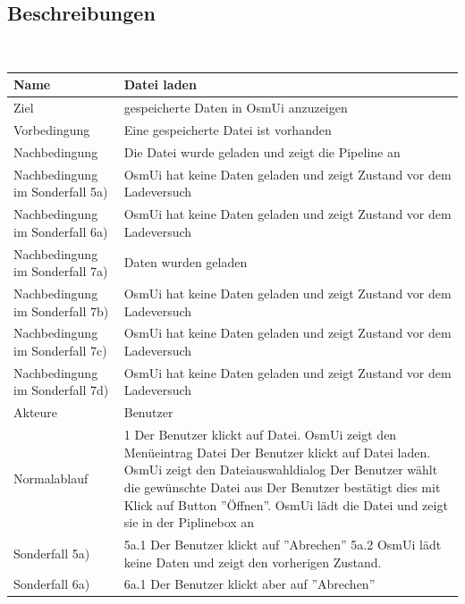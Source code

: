 \documentclass[a4paper,12pt]{scrartcl}
\begin{document}
\subsection{Beschreibungen}
\begin{center}
\ \\
\begin{tabular}{|p{5cm}|p{10cm}|}
\hline Name & \textbf{Datei laden} \\ 
\hline Ziel & gespeicherte Daten in OsmUi anzuzeigen \\ 
\hline Vorbedingung & Eine gespeicherte Datei ist vorhanden \\
\hline Nachbedingung & Die Datei wurde geladen und zeigt die Pipeline an\\ 
\hline Nachbedingung im Sonderfall 5a) & OsmUi hat keine Daten geladen und zeigt Zustand vor dem Ladeversuch \\ 
\hline Nachbedingung im Sonderfall 6a) & OsmUi hat keine Daten geladen und zeigt Zustand vor dem Ladeversuch \\ 
\hline Nachbedingung im Sonderfall 7a) & Daten wurden geladen\\
\hline Nachbedingung im Sonderfall 7b) & OsmUi hat keine Daten geladen und zeigt Zustand vor dem Ladeversuch \\
\hline Nachbedingung im Sonderfall 7c) & OsmUi hat keine Daten geladen und zeigt Zustand vor dem Ladeversuch \\
\hline Nachbedingung im Sonderfall 7d) & OsmUi hat keine Daten geladen und zeigt Zustand vor dem Ladeversuch \\
\hline Akteure & Benutzer \\ 
\hline Normalablauf & 1 Der Benutzer klickt auf Datei.
\newline 2 OsmUi zeigt den Menüeintrag Datei
\newline 3 Der Benutzer klickt auf Datei laden.
\newline 4 OsmUi zeigt den Dateiauswahldialog
\newline 5 Der Benutzer wählt die gewünschte Datei aus
\newline 6 Der Benutzer bestätigt dies mit Klick auf Button ''Öffnen''.
\newline 7 OsmUi lädt die Datei und zeigt sie in der Piplinebox an\\ 
\hline Sonderfall 5a) & 5a.1 Der Benutzer klickt auf ''Abrechen''
\newline 5a.2 OsmUi lädt keine Daten und zeigt den vorherigen Zustand.\\
\hline Sonderfall 6a) & 6a.1 Der Benutzer klickt aber auf ''Abrechen''

\end{tabular}
\end{center}
\end{document}
